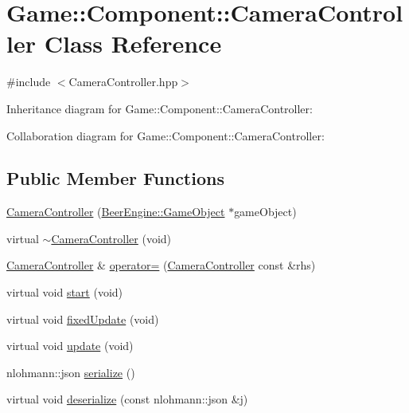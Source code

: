 \hypertarget{class_game_1_1_component_1_1_camera_controller}{}\section{Game\+:\+:Component\+:\+:Camera\+Controller Class Reference}
\label{class_game_1_1_component_1_1_camera_controller}


{\ttfamily \#include $<$Camera\+Controller.\+hpp$>$}



Inheritance diagram for Game\+:\+:Component\+:\+:Camera\+Controller\+:


Collaboration diagram for Game\+:\+:Component\+:\+:Camera\+Controller\+:
\subsection*{Public Member Functions}
\begin{DoxyCompactItemize}
\item 
\mbox{\hyperlink{class_game_1_1_component_1_1_camera_controller_ac9ced75e848e973c4a2f25e25059a4f7}{Camera\+Controller}} (\mbox{\hyperlink{class_beer_engine_1_1_game_object}{Beer\+Engine\+::\+Game\+Object}} $\ast$game\+Object)
\item 
virtual \mbox{\hyperlink{class_game_1_1_component_1_1_camera_controller_a6cbf885ec5705638f392a40bb762bd9c}{$\sim$\+Camera\+Controller}} (void)
\item 
\mbox{\hyperlink{class_game_1_1_component_1_1_camera_controller}{Camera\+Controller}} \& \mbox{\hyperlink{class_game_1_1_component_1_1_camera_controller_a5b4d4521b4ceeba0f98ba3663015725c}{operator=}} (\mbox{\hyperlink{class_game_1_1_component_1_1_camera_controller}{Camera\+Controller}} const \&rhs)
\item 
virtual void \mbox{\hyperlink{class_game_1_1_component_1_1_camera_controller_afe64421588babbf921d77756fa38a48b}{start}} (void)
\item 
virtual void \mbox{\hyperlink{class_game_1_1_component_1_1_camera_controller_a0bdce3356bde07f277e0c58409c1f55d}{fixed\+Update}} (void)
\item 
virtual void \mbox{\hyperlink{class_game_1_1_component_1_1_camera_controller_a675655ee2e18382203f1afa2329a1739}{update}} (void)
\item 
nlohmann\+::json \mbox{\hyperlink{class_game_1_1_component_1_1_camera_controller_a1a7f36bf3f1f25b0edd404146f0c3289}{serialize}} ()
\item 
virtual void \mbox{\hyperlink{class_game_1_1_component_1_1_camera_controller_a8076e01593ef38a83c708854906abb3b}{deserialize}} (const nlohmann\+::json \&j)
\end{DoxyCompactItemize}
